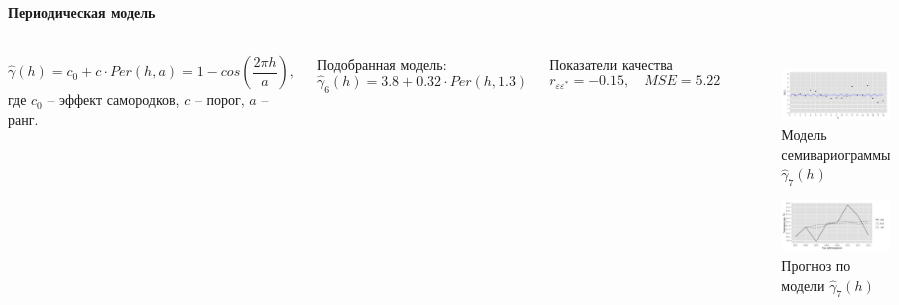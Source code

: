\documentclass[notheorems]{beamer}
\theoremstyle{definition}
\theoremstyle{example}
\theoremstyle{plain}
\begin{document}
\begin{frame}
  \frametitle{\large\secname}
  \framesubtitle{Периодическая модель}
  \begin{columns}[c]
  \column{3in}
  \begin{equation*}
    \widehat{\gamma}(h) = c_0 + c \cdot Per(h, a) = 1 - cos(\frac{2 \pi h}{a}),
  \end{equation*}
  где $ c_0 $ -- эффект самородков, $ c $ -- порог, $ a $ -- ранг.

  \vspace{0.5em}

  Подобранная модель:
  \begin{equation}
  \label{eq:gamma10}
    \widehat{\gamma}_6(h) = 3.8 + 0.32 \cdot Per(h, 1.3)
  \end{equation}

  Показатели качества
  \begin{equation*}
    r_{\varepsilon\varepsilon^{*}} = -0.15, \quad MSE = 5.22
  \end{equation*}

  \column{3in}
  \vspace{-14.5pt}
  \begin{figure}[H]
    \includegraphics[width=0.9\linewidth]{../../figures/variogram/auto-class-18-modeled.png} \\
    \caption{Модель семивариограммы $\widehat{\gamma}_7(h)$}
    \includegraphics[width=0.9\linewidth]{../../figures/variogram/auto-class-18-cross-prediction.png}
    \caption{Прогноз по модели $\widehat{\gamma}_7(h)$}
  \end{figure}
  \end{columns}
\end{frame}
\end{document}
